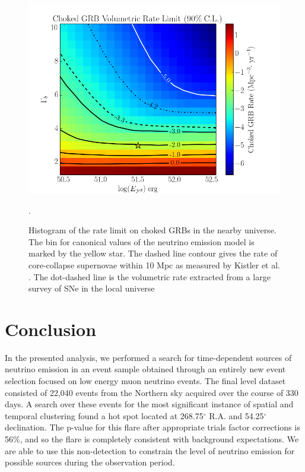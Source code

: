 \documentclass{gatech-thesis}
\begin{document}
\begin{figure}[ht]
  \begin{center}
    \includegraphics[width=1.0\textwidth,keepaspectratio]{RateLimit_2DHisto_wContours_SysAdj.png}
  \end{center}
  \caption[Choked GRB Volumetric Rate Limit]{Histogram of the rate limit on choked GRBs in the nearby universe. The bin for canonical values of the neutrino emission model is marked by the yellow star. The dashed line contour gives the rate of core-collapse supernovae within 10 Mpc as measured by Kistler et al. \cite{2011PhRvD..83l3008K}. The dot-dashed line is the volumetric rate extracted from a large survey of SNe in the local universe \cite{2011MNRAS.412.1419L}}.
  \label{fig:ParameterDepRateLimit}
\end{figure}

\chapter{Conclusion}
In the presented analysis, we performed a search for time-dependent sources of neutrino emission in an event sample obtained through an entirely new event selection focused on low energy muon neutrino events. The final level dataset consisted of 22,040 events from the Northern sky acquired over the course of 330 days. A search over these events for the most significant instance of spatial and temporal clustering found a hot spot located at 268.75$^{\circ}$ R.A. and 54.25$^{\circ}$ declination. The p-value for this flare after appropriate trials factor corrections is 56$\%$, and so the flare is completely consistent with background expectations. We are able to use this non-detection to constrain the level of neutrino emission for possible sources during the observation period.
\end{document}
